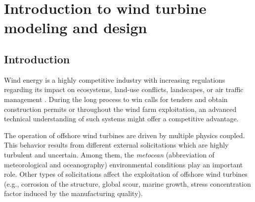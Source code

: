 \chapter{Introduction to wind turbine modeling and design}
\hfill
\localtableofcontents
\newpage







\section{Introduction}

Wind energy is a highly competitive industry with increasing regulations regarding its impact on ecosystems, land-use conflicts, landscapes, or air traffic management \citep{eolien_en_mer_2022}. 
During the long process to win calls for tenders and obtain construction permits or throughout the wind farm exploitation, an advanced technical understanding of such systems might offer a competitive advantage. 

The operation of offshore wind turbines are driven by multiple physics coupled. 
This behavior results from different external solicitations which are highly turbulent and uncertain. 
Among them, the \textit{metocean} (abbreviation of meteorological and oceanography) environmental conditions play an important role.
Other types of solicitations affect the exploitation of offshore wind turbines (e.g., corrosion of the structure, global scour, marine growth, stress concentration factor induced by the manufacturing quality). 

